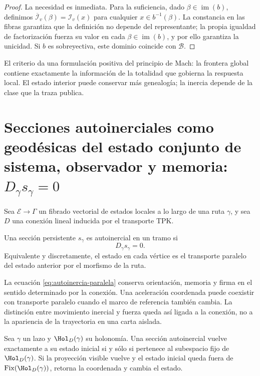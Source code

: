 \begin{proof}
La necesidad es inmediata. Para la suficiencia, dado
\(\beta\in\operatorname{im}(b)\), definimos
\(\overline{\mathcal I}_v(\beta)=\mathcal I_v(x)\) para cualquier
\(x\in b^{-1}(\beta)\). La constancia en las fibras garantiza que la
definición no depende del representante; la propia igualdad de factorización
fuerza su valor en cada \(\beta\in\operatorname{im}(b)\), y por ello garantiza
la unicidad. Si \(b\) es sobreyectiva, este dominio coincide con
\(\mathcal B\).
\end{proof}

El criterio da una formulación positiva del principio de Mach: la frontera
global contiene exactamente la información de la totalidad que gobierna la
respuesta local. El estado interior puede conservar más genealogía; la
inercia depende de la clase que la traza publica.

\section{Secciones autoinerciales como geodésicas del estado conjunto de sistema, observador y memoria: \(D_\gamma s_\gamma=0\)}

Sea \(\mathcal E\to\Gamma\) un fibrado vectorial de estados locales a lo largo
de una ruta \(\gamma\), y sea \(D\) una conexión lineal inducida por el
transporte TPK.

\begin{definition}
Una sección persistente \(s_\gamma\) es autoinercial en un tramo si
\begin{equation}
 D_\gamma s_\gamma=0.
 \label{eq:autoinercia-paralela}
\end{equation}
Equivalente y discretamente, el estado en cada vértice es el transporte
paralelo del estado anterior por el morfismo de la ruta.
\end{definition}

La ecuación \eqref{eq:autoinercia-paralela} conserva orientación, memoria y
firma en el sentido determinado por la conexión. Una aceleración coordenada
puede coexistir con transporte paralelo cuando el marco de referencia también
cambia. La distinción entre movimiento inercial y fuerza queda así ligada a
la conexión, no a la apariencia de la trayectoria en una carta aislada.

\begin{proposition}
\label{prop:autoinercia-holonomia}
Sea \(\gamma\) un lazo y \(\Hol_D(\gamma)\) su holonomía. Una sección
autoinercial vuelve exactamente a su estado inicial si y sólo si pertenece al
subespacio fijo de \(\Hol_D(\gamma)\). Si la proyección visible vuelve y el
estado inicial queda fuera de
\(\operatorname{Fix}(\Hol_D(\gamma))\), retorna la coordenada y cambia el
estado.
\end{proposition}

